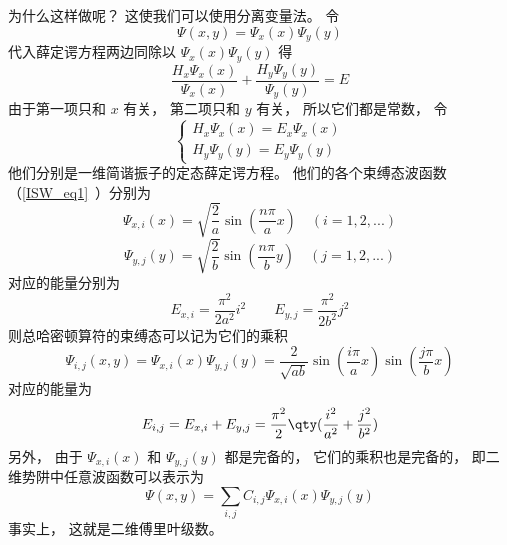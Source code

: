 为什么这样做呢？ 这使我们可以使用分离变量法。 令
\begin{equation}
\Psi(x, y) = \Psi_x(x)\Psi_y(y)
\end{equation}
代入薛定谔方程两边同除以 $\Psi_x(x)\Psi_y(y)$ 得
\begin{equation}
\frac{H_x \Psi_x(x)}{\Psi_x(x)} + \frac{H_y \Psi_y(y)}{\Psi_y(y)} = E
\end{equation}
由于第一项只和 $x$ 有关， 第二项只和 $y$ 有关， 所以它们都是常数， 令
\begin{equation}
\begin{cases}
H_x \Psi_x(x) = E_x \Psi_x(x)\\
H_y \Psi_y(y) = E_y \Psi_y(y)
\end{cases}
\end{equation}
他们分别是一维简谐振子的定态薛定谔方程。 他们的各个束缚态波函数（\autoref{ISW_eq1}~）分别为
\begin{equation}
\Psi_{x, i}(x) = \sqrt{\frac{2}{a}} \sin(\frac{n\pi}{a} x) \quad (i = 1,2,...)
\end{equation}
\begin{equation}
\Psi_{y, j}(y) = \sqrt{\frac{2}{b}} \sin(\frac{n\pi }{b} y) \quad (j = 1,2,...)
\end{equation}
对应的能量分别为
\begin{equation}
E_{x, i} = \frac{\pi^2}{2 a^2} i^2
\qquad
E_{y, j} = \frac{\pi^2}{2 b^2} j^2
\end{equation}
则总哈密顿算符的束缚态可以记为它们的乘积
\begin{equation}
\Psi_{i, j}(x, y) = \Psi_{x, i}(x) \Psi_{y, j}(y) = \frac{2}{\sqrt{ab}} \sin(\frac{i \pi}{a} x) \sin(\frac{j \pi}{b} x)
\end{equation}
对应的能量为
\begin{equation}
E_{i, j} = E_{x,i} + E_{y,j} = \frac{\pi^2}{2} \qty(\frac{i^2}{a^2} + \frac{j^2}{b^2})
\end{equation}
另外， 由于 $\Psi_{x, i}(x)$ 和 $\Psi_{y, j}(y)$ 都是完备的， 它们的乘积也是完备的， 即二维势阱中任意波函数可以表示为
\begin{equation}
\Psi(x, y) = \sum_{i,j} C_{i, j} \Psi_{x, i}(x) \Psi_{y, j}(y)
\end{equation}
事实上， 这就是二维傅里叶级数。 %
